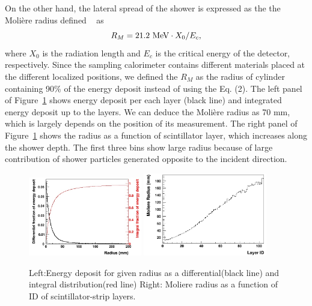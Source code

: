 \documentclass[jkps,preprint,fleqn,showpacs,showkeys]{revtex4}
\begin{document}
On the other hand, the lateral spread of the shower
is expressed as the the Molière radius defined ~\cite{PDG} as 
\begin{equation}
R_M= 21.2~{\rm MeV}\cdot X_0 /E_c,
\end{equation}
where $X_0$ is the radiation length and $E_c$ is the critical energy of the detector, respectively. 
Since the sampling calorimeter contains different materials placed at the different localized positions, we defined the $R_M$ as the radius of cylinder containing 90\% of the energy deposit instead of using the Eq. (2). The left panel of Figure~\ref{fig:Moliere_vis} shows energy deposit per each layer (black line) and integrated energy deposit up to the layers. We can deduce the Molière radius as 70 mm, which is largely depends on the position of its measurement. The right panel of Figure~\ref{fig:Moliere_vis} shows the radius as a function of scintillator layer, which increases along the shower depth. The first three bins show large radius because of large contribution of shower particles generated opposite to the incident direction.    


\begin{figure}[!hbt]
\includegraphics[width=0.44\textwidth]{figures/Edep_R.jpg}
\includegraphics[width=0.48\textwidth]{figures/Moliere_layer.jpg}
\caption{Left:Energy deposit for given radius as a differential(black line) and integral distribution(red line) Right: Moliere radius as a function of ID of scintillator-strip layers.}
\label{fig:Moliere_vis}
\end{figure}
\end{document}
